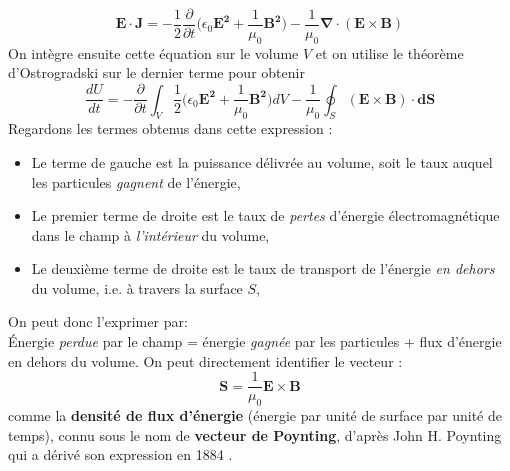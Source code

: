 \begin{equation*}
\bm{E} \cdot \bm{J} = -\frac{1}{2}\frac{\partial}{\partial t}\biggl(\epsilon_0\bm{E^2}+\frac{1}{\mu_0}\bm{B^2}\biggl)-\frac{1}{\mu_0}\bm{\nabla} \cdot (\bm{E} \times \bm{B})
\end{equation*}
On intègre ensuite cette équation sur le volume $V$ et on utilise le théorème d'Ostrogradski sur le dernier terme pour obtenir
\begin{equation*}
\frac{dU}{dt} = -\frac{\partial}{\partial t}\int_V\frac{1}{2}\biggl(\epsilon_0\bm{E^2}+\frac{1}{\mu_0}\bm{B^2}\biggl)dV-\frac{1}{\mu_0} \oint_S(\bm{E} \times \bm{B})\cdot\bm{dS}
\end{equation*}
Regardons les termes obtenus dans cette expression :
\begin{itemize}
\item Le terme de gauche est la puissance délivrée au volume, soit le taux auquel les particules \textit{gagnent} de l'énergie,
\item Le premier terme de droite est le taux de \textit{pertes} d'énergie électromagnétique dans le champ à \textit{l'intérieur} du volume,
\item Le deuxième terme de droite est le taux de transport de l'énergie \textit{en dehors} du volume, i.e. à travers la surface $S$,
\end{itemize}
On peut donc l'exprimer par:\\\'Energie \textit{perdue} par le champ = énergie \textit{gagnée} par les particules + flux d'énergie en dehors du volume. On peut directement identifier le vecteur :
\begin{equation*}
\bm{S} = \frac{1}{\mu_0}\bm{E}\times\bm{B}
\end{equation*}
comme la \textbf{densité de flux d'énergie} (énergie par unité de surface par unité de temps), connu sous le nom de \textbf{vecteur de Poynting}, d'après John H. Poynting qui a dérivé son expression en 1884 . 